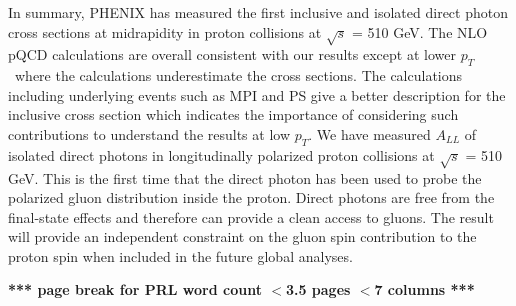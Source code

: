 \documentclass[twocolumn,letterpaper,aps,prl,longbibliography,superscriptaddress,floatfix]{revtex4-2}
\newcommand{\pT}{\ensuremath{p_T}}
\begin{document}
In summary, PHENIX has measured the first inclusive and isolated direct photon cross sections at midrapidity in proton collisions at $\sqrt{s}$ = 510 GeV. The NLO pQCD calculations are overall consistent with our results except at lower \pT\ where the calculations underestimate the cross sections. The calculations including underlying events such as MPI and PS give a better description for the inclusive cross section which indicates the importance of considering such contributions to understand the results at low $p_{T}$. We have measured $A_{LL}$ of isolated direct photons in longitudinally polarized proton collisions at $\sqrt{s}$ = 510 GeV. This is the first time that the direct photon has been used to probe the polarized gluon distribution inside the proton. Direct photons are free from the final-state effects and therefore can provide a clean access to gluons. The result will provide an independent constraint on the gluon spin contribution to the proton spin when included in the future global analyses.

\clearpage \textbf{*** page break for PRL word count $<$3.5 pages $<$7 columns ***}




\end{document}
